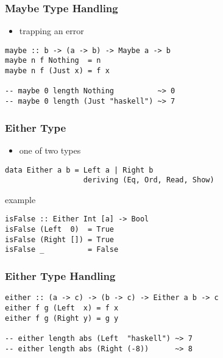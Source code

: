 \documentclass[dvipsnames]{beamer}
\theoremstyle{plain}
\begin{document}
\begin{frame}[fragile]
  \frametitle{Maybe Type Handling}

  \begin{itemize}
    \item trapping an error
  \end{itemize}

  \begin{exampleblock}{}
    \begin{lstlisting}
maybe :: b -> (a -> b) -> Maybe a -> b
maybe n f Nothing  = n
maybe n f (Just x) = f x

-- maybe 0 length Nothing          ~> 0
-- maybe 0 length (Just "haskell") ~> 7
    \end{lstlisting}
  \end{exampleblock}
\end{frame}

\begin{frame}[fragile]
  \frametitle{Either Type}

  \begin{itemize}
    \item one of two types
  \end{itemize}

  \begin{lstlisting}
data Either a b = Left a | Right b
                  deriving (Eq, Ord, Read, Show)
  \end{lstlisting}

  \begin{exampleblock}{example}
    \begin{lstlisting}
isFalse :: Either Int [a] -> Bool
isFalse (Left  0)  = True
isFalse (Right []) = True
isFalse _          = False
    \end{lstlisting}
  \end{exampleblock}
\end{frame}

\begin{frame}[fragile]
  \frametitle{Either Type Handling}

  \begin{lstlisting}
either :: (a -> c) -> (b -> c) -> Either a b -> c
either f g (Left  x) = f x
either f g (Right y) = g y

-- either length abs (Left  "haskell") ~> 7
-- either length abs (Right (-8))      ~> 8
  \end{lstlisting}
\end{frame}
\end{document}
